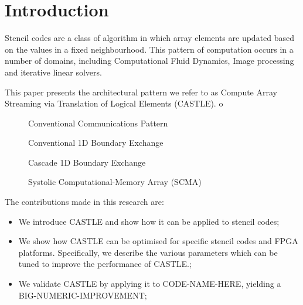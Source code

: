 \section{Introduction}
Stencil codes are a class of algorithm in which array elements are updated based on the values in a fixed neighbourhood.
This pattern of computation occurs in a number of domains, including Computational Fluid Dynamics, Image processing and iterative linear solvers.

This paper presents the architectural pattern we refer to as Compute Array Streaming via Translation of Logical Elements (CASTLE).
o

\begin{figure}
  \centering
  
  \caption{Conventional Communications Pattern}
  \label{fig:convcomms}
\end{figure}

\begin{figure}
  \centering
  
  \caption{Conventional 1D Boundary Exchange}
  \label{fig:exch1dold}
\end{figure}


\begin{figure}
  \centering
  
  \caption{Cascade 1D Boundary Exchange}
  \label{fig:trans1d}
\end{figure}

\begin{figure}
  \centering
  
  \caption{Systolic Computational-Memory Array (SCMA)}
  \label{fig:scma}
\end{figure}

The contributions made in this research are:
\begin{itemize}
  \item{We introduce CASTLE and show how it can be applied to stencil codes;}
  \item{We show how CASTLE can be optimised for specific stencil codes and FPGA platforms.
        Specifically, we describe the various parameters which can be tuned to improve the performance of CASTLE.;}
  \item{We validate CASTLE by applying it to CODE-NAME-HERE, yielding a BIG-NUMERIC-IMPROVEMENT;}
\end{itemize}
